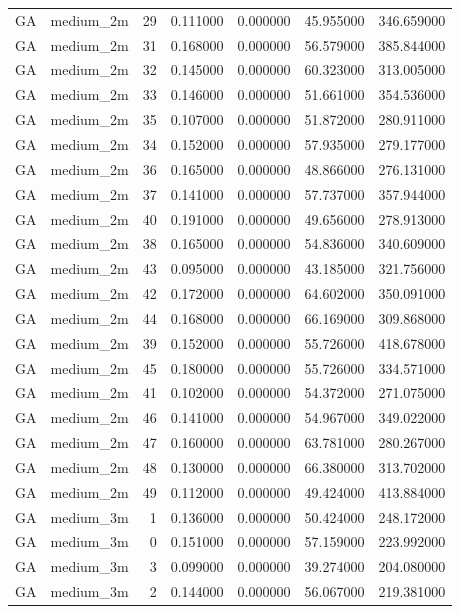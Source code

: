 \begin{tabular}{llrrrrr}
GA & medium_2m & 29 & 0.111000 & 0.000000 & 45.955000 & 346.659000 \\
GA & medium_2m & 31 & 0.168000 & 0.000000 & 56.579000 & 385.844000 \\
GA & medium_2m & 32 & 0.145000 & 0.000000 & 60.323000 & 313.005000 \\
GA & medium_2m & 33 & 0.146000 & 0.000000 & 51.661000 & 354.536000 \\
GA & medium_2m & 35 & 0.107000 & 0.000000 & 51.872000 & 280.911000 \\
GA & medium_2m & 34 & 0.152000 & 0.000000 & 57.935000 & 279.177000 \\
GA & medium_2m & 36 & 0.165000 & 0.000000 & 48.866000 & 276.131000 \\
GA & medium_2m & 37 & 0.141000 & 0.000000 & 57.737000 & 357.944000 \\
GA & medium_2m & 40 & 0.191000 & 0.000000 & 49.656000 & 278.913000 \\
GA & medium_2m & 38 & 0.165000 & 0.000000 & 54.836000 & 340.609000 \\
GA & medium_2m & 43 & 0.095000 & 0.000000 & 43.185000 & 321.756000 \\
GA & medium_2m & 42 & 0.172000 & 0.000000 & 64.602000 & 350.091000 \\
GA & medium_2m & 44 & 0.168000 & 0.000000 & 66.169000 & 309.868000 \\
GA & medium_2m & 39 & 0.152000 & 0.000000 & 55.726000 & 418.678000 \\
GA & medium_2m & 45 & 0.180000 & 0.000000 & 55.726000 & 334.571000 \\
GA & medium_2m & 41 & 0.102000 & 0.000000 & 54.372000 & 271.075000 \\
GA & medium_2m & 46 & 0.141000 & 0.000000 & 54.967000 & 349.022000 \\
GA & medium_2m & 47 & 0.160000 & 0.000000 & 63.781000 & 280.267000 \\
GA & medium_2m & 48 & 0.130000 & 0.000000 & 66.380000 & 313.702000 \\
GA & medium_2m & 49 & 0.112000 & 0.000000 & 49.424000 & 413.884000 \\
GA & medium_3m & 1 & 0.136000 & 0.000000 & 50.424000 & 248.172000 \\
GA & medium_3m & 0 & 0.151000 & 0.000000 & 57.159000 & 223.992000 \\
GA & medium_3m & 3 & 0.099000 & 0.000000 & 39.274000 & 204.080000 \\
GA & medium_3m & 2 & 0.144000 & 0.000000 & 56.067000 & 219.381000 \\

\end{tabular}
